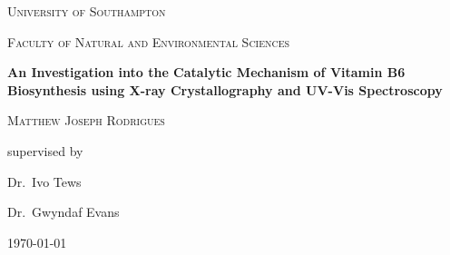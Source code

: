 
\begin{titlepage}
	\centering
	\par\vspace{1cm}
	{\scshape\LARGE University of Southampton \par}
	\vspace{1cm}
	{\scshape\Large Faculty of Natural and Environmental Sciences\par}
	\vspace{1.5cm}
	{\Large\bfseries An Investigation into the Catalytic Mechanism of Vitamin B6 Biosynthesis using X-ray Crystallography and UV-Vis Spectroscopy\par}
	\vspace{2cm}
	{\Large\scshape Matthew Joseph Rodrigues\par}
	\vfill
	supervised by\par
	Dr.~Ivo Tews\par
	Dr.~Gwyndaf Evans 
	
	\vfill

	{\large \today\par}
\end{titlepage}
\null\cleardoublepage
